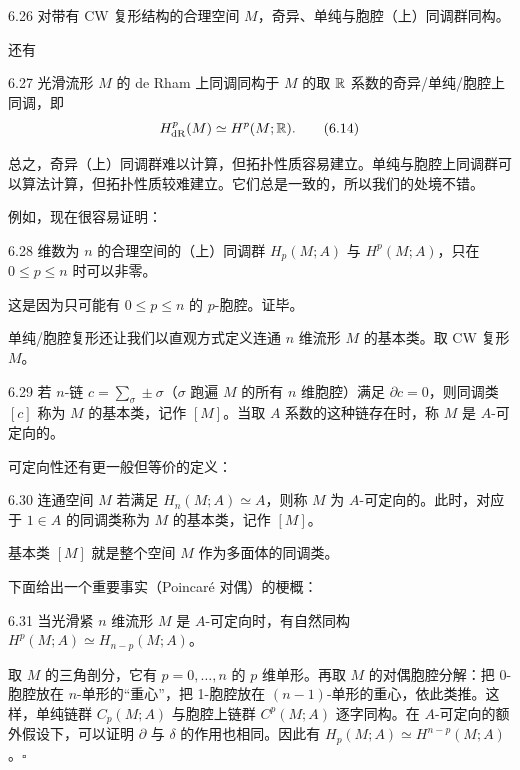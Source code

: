 \begin{theorem}{6.26}
  对带有 CW 复形结构的合理空间 $M$，奇异、单纯与胞腔（上）同调群同构。
\end{theorem}

还有

\begin{theorem}{6.27}
  光滑流形 $M$ 的 de Rham 上同调同构于 $M$ 的取 $\mathbb{R}$ 系数的奇异/单纯/胞腔上同调，即
  \begin{equation}
    H^p_{\mathrm{dR}}(M)\simeq H^p(M;\mathbb{R}).
    \tag{6.14}
  \end{equation}
\end{theorem}

总之，奇异（上）同调群难以计算，但拓扑性质容易建立。单纯与胞腔上同调群可以算法计算，但拓扑性质较难建立。它们总是一致的，所以我们的处境不错。

例如，现在很容易证明：

\begin{corollary}{6.28}
  维数为 $n$ 的合理空间的（上）同调群 $H_p(M;A)$ 与 $H^p(M;A)$，只在 $0\le p\le n$ 时可以非零。
\end{corollary}

这是因为只可能有 $0\le p\le n$ 的 $p$-胞腔。证毕。

单纯/胞腔复形还让我们以直观方式定义连通 $n$ 维流形 $M$ 的基本类。取 CW 复形 $M$。

\begin{definition}{6.29}
  若 $n$-链 $c=\sum_\sigma\pm\sigma$（$\sigma$ 跑遍 $M$ 的所有 $n$ 维胞腔）满足 $\partial c=0$，则同调类 $[c]$ 称为 $M$ 的基本类，记作 $[M]$。当取 $A$ 系数的这种链存在时，称 $M$ 是 $A$-可定向的。
\end{definition}

可定向性还有更一般但等价的定义：

\begin{definition}{6.30}
  连通空间 $M$ 若满足 $H_n(M;A)\simeq A$，则称 $M$ 为 $A$-可定向的。此时，对应于 $1\in A$ 的同调类称为 $M$ 的基本类，记作 $[M]$。
\end{definition}

基本类 $[M]$ 就是整个空间 $M$ 作为多面体的同调类。

下面给出一个重要事实（Poincaré 对偶）的梗概：

\begin{theorem}{6.31}
  当光滑紧 $n$ 维流形 $M$ 是 $A$-可定向时，有自然同构 $H^p(M;A)\simeq H_{n-p}(M;A)$。
\end{theorem}

取 $M$ 的三角剖分，它有 $p=0,\dots,n$ 的 $p$ 维单形。再取 $M$ 的对偶胞腔分解：把 0-胞腔放在 $n$-单形的“重心”，把 1-胞腔放在 $(n-1)$-单形的重心，依此类推。这样，单纯链群 $C_p(M;A)$ 与胞腔上链群 $C^p(M;A)$ 逐字同构。在 $A$-可定向的额外假设下，可以证明 $\partial$ 与 $\delta$ 的作用也相同。因此有 $H_p(M;A)\simeq H^{n-p}(M;A)$。$\square$

